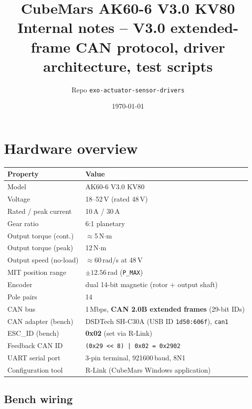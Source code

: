 \documentclass[11pt,a4paper]{article}
\title{\textbf{CubeMars AK60-6 V3.0 KV80}\\[2pt]
       \large Internal notes -- V3.0 extended-frame CAN protocol,
       driver architecture, test scripts}
\author{Repo \texttt{exo-actuator-sensor-drivers}}
\date{\today}
\begin{document}
\maketitle
\tableofcontents
\newpage

\section{Hardware overview}
\label{sec:hw}

\begin{center}\small
\begin{tabular}{ll}
\toprule
Property & Value \\
\midrule
Model                   & AK60-6 V3.0 KV80 \\
Voltage                 & 18--52\,V (rated 48\,V) \\
Rated / peak current    & 10\,A / 30\,A \\
Gear ratio              & 6:1 planetary \\
Output torque (cont.)   & $\approx$5\,N$\cdot$m \\
Output torque (peak)    & 12\,N$\cdot$m \\
Output speed (no-load)  & $\approx$60\,rad/s at 48\,V \\
MIT position range      & $\pm 12.56$\,rad (\texttt{P\_MAX}) \\
Encoder                 & dual 14-bit magnetic (rotor + output shaft) \\
Pole pairs              & 14 \\
CAN bus                 & 1\,Mbps, \textbf{CAN 2.0B extended frames} (29-bit IDs) \\
CAN adapter (bench)     & DSDTech SH-C30A (USB ID \texttt{1d50:606f}), \texttt{can1} \\
ESC\_ID (bench)         & \textbf{0x02} (set via R-Link) \\
Feedback CAN ID         & \texttt{(0x29 << 8) | 0x02 = 0x2902} \\
UART serial port        & 3-pin terminal, 921600\,baud, 8N1 \\
Configuration tool      & R-Link (CubeMars Windows application) \\
\bottomrule
\end{tabular}
\end{center}

\subsection{Bench wiring}
\end{document}
